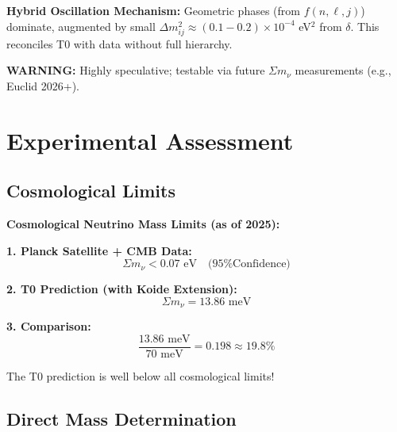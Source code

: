 \begin{koidebox}
		\textbf{Hybrid Oscillation Mechanism:}
		Geometric phases (from $f(n,\ell,j)$) dominate, augmented by small $\Delta m^2_{ij} \approx (0.1-0.2) \times 10^{-4}$ eV$^2$ from $\delta$. This reconciles T0 with data without full hierarchy.
		
		\textbf{WARNING:} Highly speculative; testable via future $\Sigma m_\nu$ measurements (e.g., Euclid 2026+).
	\end{koidebox}
	
	\section{Experimental Assessment}
	
	\subsection{Cosmological Limits}
	
	\begin{experimental}
		\textbf{Cosmological Neutrino Mass Limits (as of 2025):}
		
		\textbf{1. Planck Satellite + CMB Data:}
		\begin{equation}
			\Sigma m_\nu < 0.07 \text{ eV} \quad \text{(95\% Confidence)}
		\end{equation}
		
		\textbf{2. T0 Prediction (with Koide Extension):}
		\begin{equation}
			\Sigma m_\nu = 13.86 \text{ meV}
		\end{equation}
		
		\textbf{3. Comparison:}
		\begin{equation}
			\frac{13.86 \text{ meV}}{70 \text{ meV}} = 0.198 \approx 19.8\%
		\end{equation}
		
		The T0 prediction is well below all cosmological limits!
	\end{experimental}
	
	\subsection{Direct Mass Determination}
	
